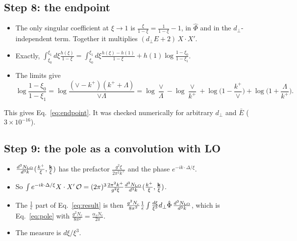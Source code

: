 \documentclass[10pt]{article}
\numberwithin{equation}{section}
\newcommand{\OO}{\mathcal O}
\begin{document}
\subsection{Step 8: the endpoint}
\begin{itemize}
\item The only singular coefficient at $\xi\to1$ is $\frac{\xi}{1-\xi}=\frac{1}{1-\xi}-1$, in $\hat\Phi$ and in the $d_\perp$-independent term. Together it multiplies $(d_\perp E+2)\,X\cdot X'$.
\item Exactly, $\int_{\xi_0}^{\xi_1}d\xi\frac{h(\xi)}{1-\xi}=\int_{\xi_0}^{\xi_1}d\xi\frac{h(\xi)-h(1)}{1-\xi}+h(1)\log\frac{1-\xi_0}{1-\xi_1}$.
\item The limits give
\begin{equation}
\log\frac{1-\xi_0}{1-\xi_1}=\log\frac{(\vee-k^+)(k^++\Lambda)}{\vee\Lambda}=\log\frac{\vee}{\Lambda}-\log\frac{\vee}{k^+}+\log\Big(1-\frac{k^+}{\vee}\Big)+\log\Big(1+\frac{\Lambda}{k^+}\Big).
\end{equation}
\end{itemize}
This gives Eq.~\eqref{eq:endpoint}. It was checked numerically for arbitrary $d_\perp$ and $\bar E$ ($3\times10^{-16}$).

\subsection{Step 9: the pole as a convolution with LO}
\begin{itemize}
\item $\frac{d^3N_{\rm LO}}{d^3k}(\frac{k^+}{\xi},\frac{\mathbf k}{\xi})$ has the prefactor $\frac{g^2\xi}{2\pi^2k^+}$ and the phase $e^{-ik\cdot\Delta/\xi}$.
\item So $\int e^{-ik\cdot\Delta/\xi}X\cdot X'\,\OO=(2\pi)^3\frac{2\pi^2k^+}{g^2\xi}\frac{d^3N_{\rm LO}}{d^3k}(\frac{k^+}{\xi},\frac{\mathbf k}{\xi})$.
\item The $\frac1{\bar\epsilon}$ part of Eq.~\eqref{eq:result} is then $\frac{g^2N_c}{8\pi^2}\frac{1}{\bar\epsilon}\int\frac{d\xi}{\xi^3}d_\perp\hat\Phi\,\frac{d^3N_{\rm LO}}{d^3k}$, which is Eq.~\eqref{eq:pole} with $\frac{g^2N_c}{8\pi^2}=\frac{\alpha_sN_c}{2\pi}$.
\item The measure is $d\xi/\xi^3$.
\end{itemize}

\end{document}

